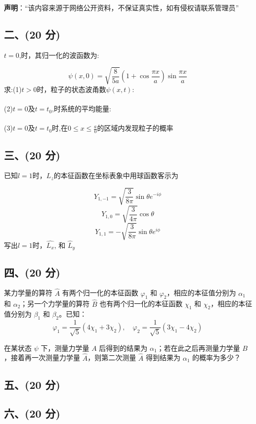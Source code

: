 
\textbf{声明}：“该内容来源于网络公开资料，不保证真实性，如有侵权请联系管理员”

\subsection{二、(20 分)}
 \( t = 0 \),时，其归一化的波函数为:

\[
\psi(x,0) = \sqrt{\frac{8}{5a}} (1 + \cos\frac{\pi x}{a}) \sin\frac{\pi x}{a}~
\]
求:(1)$t>0$时，粒子的状态波甬数$\psi(x,t)$:\\\\
(2)$t=0$及$t=t_0$,时系统的平均能量:\\\\
(3)$t=0$及$t=t_0$时,在$0\leq x\leq \frac{a}{0}$的区域内发现粒子的概率
\subsection{三、(20 分)}
已知$l=1$时，$L_z$的本征函数在坐标表象中用球函数客示为

\[Y_{1,-1} = \sqrt{\frac{3}{8\pi}} \sin \theta e^{-i\phi}~
\]
\[
Y_{1,0} = \sqrt{\frac{3}{4\pi}} \cos \theta~
\]
\[
Y_{1,1} = -\sqrt{\frac{3}{8\pi}} \sin \theta e^{i\phi}~
\]
写出$l=1$时，$\hat{L_x}$, 和 $\hat{L}_y $
\subsection{四、(20 分)}
某力学量的算符 $\hat{A}$ 有两个归一化的本征函数 $\varphi_1$ 和 $\varphi_2$，相应的本征值分别为 $\alpha_1$ 和 $\alpha_2$；另一个力学量的算符 $\hat{B}$ 也有两个归一化的本征函数 $\chi_1$ 和 $\chi_2$，相应的本征值分别为 $\beta_1$ 和 $\beta_2$。已知：
$$\varphi_1 = \frac{1}{\sqrt{5}} (4 \chi_1 + 3 \chi_2), \quad \varphi_2 = \frac{1}{\sqrt{5}} (3 \chi_1 - 4 \chi_2)~$$

在某状态 $\psi$ 下，测量力学量 $A$ 后得到的结果为 $\alpha_1$；若在此之后再测量力学量 $B$，接着再一次测量力学量 $\hat{A}$，则第二次测量 $\hat{A}$ 得到结果为 $\alpha_1$ 的概率为多少？
\subsection{五、(20 分)}

\subsection{六、(20 分)}




